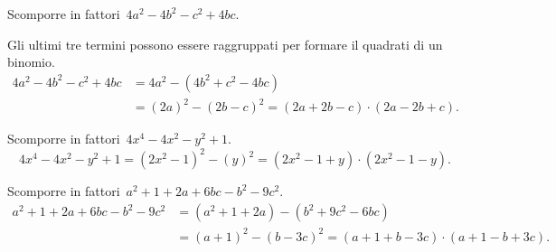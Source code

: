 \begin{exrig}
 \begin{esempio}
Scomporre in fattori~$4a^{2}-4b^{2}-c^{2}+4bc$.

Gli ultimi tre termini possono essere raggruppati per formare il quadrati di un binomio.
 \begin{equation*}
   \begin{split}
     4a^{2}-4b^{2}-c^{2}+4bc &=4a^{2}-\left(4b^{2}+c^{2}-4bc\right) \\
                 &= (2a)^{2}-(2b-c)^{2}=(2a+2b-c)\cdot (2a-2b+c).
   \end{split}
  \end{equation*}
 \end{esempio}

 \begin{esempio}
Scomporre in fattori~$4x^{4}-4x^{2}-y^{2}+1$.
\[4x^{4}-4x^{2}-y^{2}+1=\left(2x^{2}-1\right)^{2}-(y)^{2}=(2x^{2}-1+y)\cdot (2x^{2}-1-y).\]
 \end{esempio}

 \begin{esempio}
Scomporre in fattori~$a^{2}+1+2a+6bc-b^{2}-9c^{2}$.
 \begin{equation*}
   \begin{split}
     a^{2}+1+2a+6bc-b^{2}-9c^{2} &=\left(a^{2}+1+2a\right)-\left(b^{2}+9c^{2}-6{bc}\right) \\
                 &= (a+1)^{2}-(b-3c)^{2}=(a+1+b-3c)\cdot (a+1-b+3c).
   \end{split}
  \end{equation*}
 \end{esempio}
\end{exrig}
\ovalbox{\risolvii \ref{ese:16.29}, \ref{ese:16.30}, \ref{ese:16.31}, \ref{ese:16.32}, \ref{ese:16.33}, \ref{ese:16.34}, \ref{ese:16.35}, \ref{ese:16.36},%
\ref{ese:16.37}, \ref{ese:16.38}, \ref{ese:16.39}}

\vspazio\ovalbox{\ref{ese:16.40}, \ref{ese:16.41}}
\newpage

\cleardoublepage
